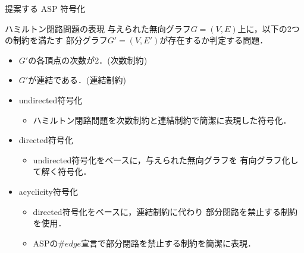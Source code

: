 \documentclass[dvipdfmx,11pt]{beamer}
\begin{document}
\begin{frame}{提案する ASP 符号化}
  \begin{block}{ハミルトン閉路問題の表現}
    与えられた無向グラフ$G= (V,E)$上に，以下の2つの制約を満たす
    部分グラフ$G'= (V,E')$が存在するか判定する問題．
    \begin{itemize}
    \item $G'$の各頂点の次数が2．(\alert{次数制約})
    \item $G'$が連結である．(\alert{連結制約})
    \end{itemize}
  \end{block}
  \begin{itemize}
  \item \alert{\textsf{undirected}符号化}
    \begin{itemize}
    \item ハミルトン閉路問題を次数制約と連結制約で簡潔に表現した符号化．
    \end{itemize}
  \item \alert{\textsf{directed}符号化}
    \begin{itemize}
    \item \textsf{undirected}符号化をベースに，与えられた無向グラフを
      有向グラフ化して解く符号化．
    \end{itemize}
  \item \alert{\textsf{acyclicity}符号化}
    \begin{itemize}
    \item \textsf{directed}符号化をベースに，連結制約に代わり
      部分閉路を禁止する制約を使用．
      \item ASPの$\#edge$宣言で部分閉路を禁止する制約を簡潔に表現．
    \end{itemize}
  \end{itemize}
\end{frame}
\end{document}
